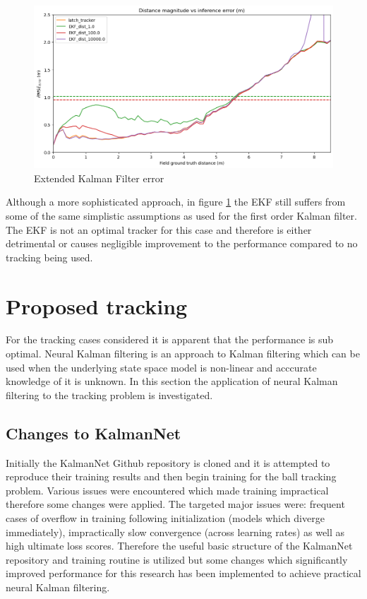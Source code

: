 \documentclass[a4paper,twoside,12pt]{report}
\begin{document}
\begin{figure}[h!]
\begin{center}
\includegraphics[width=12cm]{images/ekf_error.png}
\caption{Extended Kalman Filter error}
\label{fig:ekferror}
\end{center}
\end{figure}

Although a more sophisticated approach, in figure \ref{fig:ekferror} the EKF still suffers from some of the same simplistic assumptions as used for the first order Kalman filter. The EKF is not an optimal tracker for this case and therefore is either detrimental or causes negligible improvement to the performance compared to no tracking being used.

\newpage
\section{Proposed tracking}

For the tracking cases considered it is apparent that the performance is sub optimal. Neural Kalman filtering is an approach to Kalman filtering which can be used when the underlying state space model is non-linear and acccurate knowledge of it is unknown. In this section the application of neural Kalman filtering to the tracking problem is investigated.

\subsection{Changes to KalmanNet}

Initially the KalmanNet Github repository \cite{kalmangit} is cloned and it is attempted to reproduce their training results and then begin training for the ball tracking problem. Various issues were encountered which made training impractical therefore some changes were applied. The targeted major issues were: frequent cases of overflow in training following initialization (models which diverge immediately), impractically slow convergence (across learning rates) as well as high ultimate loss scores. Therefore the useful basic structure of the KalmanNet repository and training routine is utilized but some changes which significantly improved performance for this research has been implemented to achieve practical neural Kalman filtering. 
\end{document}
